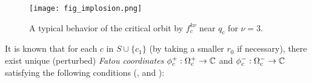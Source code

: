\begin{figure}[htbp]
\begin{center}
\texttt{[image: fig\_implosion.png]}
\end{center}
\caption{\small A typical behavior of the critical orbit 
by $f_c^{k \nu }$ near $q_c$ for $\nu =3$.}
\label{fig_implosion}
\end{figure}

It is known that for each $c$ in $S \cup \{c_1\}$ 
(by taking a smaller $r_0$ if necessary),
there exist unique (perturbed) {\it Fatou coordinates} 
$\phi_c^ + :\Omega_c^ +  \to \mathbb C$ 
and
$\phi_c^-:\Omega_c^- \to \mathbb C$
satisfying the following conditions
(\cite{Lavaurs 1989}, \cite{DSZ 1997} and \cite[Proposition A.2.1]{Shishikura 1998}):

